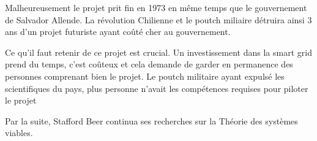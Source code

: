 Malheureusement le projet prit fin en 1973 en même temps que le gouvernement de Salvador Allende.
La révolution Chilienne et le poutch miliaire détruira ainsi 3 ans d'un projet futuriste ayant
coûté cher au gouvernement.

Ce qu'il faut retenir de ce projet est crucial. Un investissement dans la smart grid prend du temps,
c'est coûteux et cela demande de garder en permanence des personnes comprenant bien le projet.
Le poutch militaire ayant expulsé les scientifiques du pays, plus personne n'avait les compétences
requises pour piloter le projet

Par la suite, Stafford Beer continua ses recherches sur la Théorie des systèmes viables.















